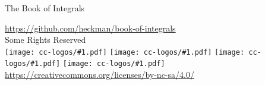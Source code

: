 \newcommand\cclogo[1]{%
\texttt{[image: cc-logos/\#1.pdf]}%
}
\null\vfill
\begin{center}
The Book of Integrals\\
\begin{footnotesize}
\url{https://github.com/heckman/book-of-integrals}\\[1ex]%
Some Rights Reserved\\[1ex]%
\cclogo{cc} \cclogo{by} \cclogo{nc} \cclogo{sa}\\[-0.5ex]%
\url{https://creativecommons.org/licenses/by-nc-sa/4.0/}
\end{footnotesize}
\end{center}
